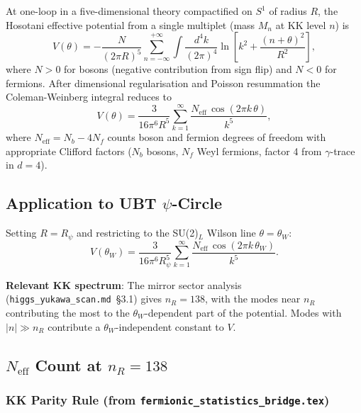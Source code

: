 \documentclass[12pt]{article}
\theoremstyle{definition}
\theoremstyle{remark}
\begin{document}
At one-loop in a five-dimensional theory compactified on $S^1$ of radius
$R$, the Hosotani effective potential from a single multiplet (mass $M_n$
at KK level $n$) is
\begin{equation}
  \label{eq:hosotani_veff_general}
  V(\theta) = -\frac{N}{(2\pi R)^5}
              \sum_{n=-\infty}^{+\infty} \int \frac{d^4k}{(2\pi)^4}
              \ln\!\left[k^2 + \frac{(n+\theta)^2}{R^2}\right],
\end{equation}
where $N > 0$ for bosons (negative contribution from sign flip)
and $N < 0$ for fermions.  After dimensional regularisation and
Poisson resummation the Coleman-Weinberg integral reduces to
\begin{equation}
  \label{eq:hosotani_veff}
  V(\theta) = \frac{3}{16\pi^6 R^5}
              \sum_{k=1}^{\infty}
              \frac{N_{\text{eff}}\,\cos(2\pi k\,\theta)}{k^5},
\end{equation}
where $N_{\text{eff}} = N_b - 4N_f$ counts boson and fermion degrees
of freedom with appropriate Clifford factors ($N_b$ bosons, $N_f$
Weyl fermions, factor 4 from $\gamma$-trace in $d=4$).

\subsection{Application to UBT $\psi$-Circle}

Setting $R = R_\psi$ and restricting to the SU(2)$_L$ Wilson line
$\theta = \theta_W$:
\begin{equation}
  \label{eq:hosotani_ubt}
  V(\theta_W) = \frac{3}{16\pi^6 R_\psi^5}
                \sum_{k=1}^{\infty}
                \frac{N_{\text{eff}}\,\cos(2\pi k\,\theta_W)}{k^5}.
\end{equation}

\noindent\textbf{Relevant KK spectrum}: The mirror sector analysis
(\texttt{higgs\_yukawa\_scan.md}~§3.1) gives $n_R = 138$, with the
modes near $n_R$ contributing the most to the $\theta_W$-dependent
part of the potential.  Modes with $|n| \gg n_R$ contribute a
$\theta_W$-independent constant to $V$.

\subsection{$N_{\text{eff}}$ Count at $n_R = 138$}
\label{sec:neff_count}


\subsubsection{KK Parity Rule (from \texttt{fermionic\_statistics\_bridge.tex})}
\end{document}
